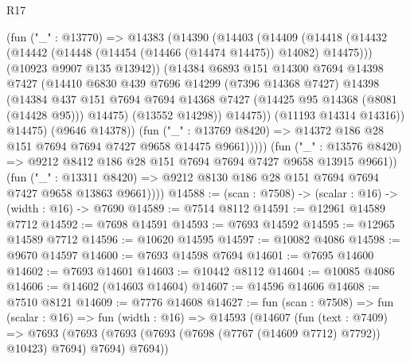 \begin{lexlean}{R17}
\begin{coremodule}
                    (fun ("_" : @13770) =>
                    @14383
                      (@14390
                        (@14403
                          (@14409
                            (@14418
                              (@14432
                                (@14442 (@14448 (@14454 (@14466 (@14474 @14475)) @14082) @14475)))
                              (@10923 @9907 @135 @13942))
                            (@14384
                              @6893
                              @151
                              @14300
                              @7694
                              @14398
                              @7427
                              (@14410
                                @6830
                                @439
                                @7696
                                @14299
                                (@7396 @14368 @7427)
                                @14398
                                (@14384
                                  @437
                                  @151
                                  @7694
                                  @7694
                                  @14368
                                  @7427
                                  (@14425 @95 @14368 (@8081 (@14428 @95)))
                                  @14475)
                                (@13552 @14298))
                              @14475))
                          (@11193 @14314 @14316))
                        @14475)
                      (@9646 @14378))
                    (fun ("_" : @13769 @8420) =>
                    @14372 @186 @28 @151 @7694 @7694 @7427 @9658 @14475 @9661)))))
            (fun ("_" : @13576 @8420) =>
            @9212 @8412 @186 @28 @151 @7694 @7694 @7427 @9658 @13915 @9661))
          (fun ("_" : @13311 @8420) =>
          @9212 @8130 @186 @28 @151 @7694 @7694 @7427 @9658 @13863 @9661))))
@14588 := (scan : @7508) -> (scalar : @16) -> (width : @16) -> @7690
@14589 := @7514 @8112
@14591 := @12961 @14589 @7712
@14592 := @7698 @14591
@14593 := @7693 @14592
@14595 := @12965 @14589 @7712
@14596 := @10620 @14595
@14597 := @10082 @4086
@14598 := @9670 @14597
@14600 := @7693 @14598 @7694
@14601 := @7695 @14600
@14602 := @7693 @14601
@14603 := @10442 @8112
@14604 := @10085 @4086
@14606 := @14602 (@14603 @14604)
@14607 := @14596 @14606
@14608 := @7510 @8121
@14609 := @7776 @14608
@14627 := fun (scan : @7508) =>
  fun (scalar : @16) =>
  fun (width : @16) =>
  @14593
    (@14607
      (fun (text : @7409) =>
      @7693 (@7693 (@7693 (@7693 (@7698 (@7767 (@14609 @7712) @7792)) @10423) @7694) @7694) @7694))

\end{coremodule}
\end{lexlean}
